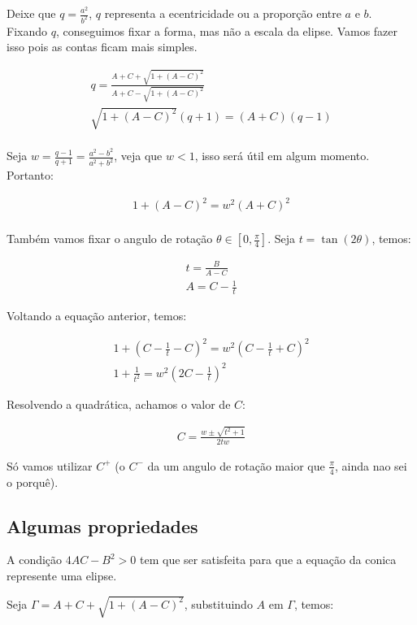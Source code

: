 \documentclass{article}
\begin{document}
	Deixe que $q = \frac{a^2}{b^2}$, $q$ representa a ecentricidade ou a proporção entre $a$ e $b$. Fixando $q$, conseguimos fixar a forma, mas não a escala da elipse. Vamos fazer isso pois as contas ficam mais simples.
	
	\begin{align*}
	q = \frac{A + C + \sqrt{1 + (A-C)^2}}{A + C - \sqrt{1 + (A-C)^2}}\\
	\sqrt{1 + (A-C)^2}(q+1) = (A+C)(q-1)\\
	\end{align*}
	
	Seja $w = \frac{q-1}{q+1} = \frac{a^2-b^2}{a^2+b^2}$, veja que $w < 1$, isso será útil em algum momento. Portanto:
	
	\begin{align*}
	1 + (A-C)^2 = w^2(A+C)^2\\	
	\end{align*}
	
	Também vamos fixar o angulo de rotação $\theta \in [0, \frac{\pi}{4}]$. Seja $t = \tan{(2\theta)}$, temos:
	
	\begin{align*}
	t = \frac{B}{A-C}\\
	A = C - \frac{1}{t}
	\end{align*}
	
	Voltando a equação anterior, temos:
	
	\begin{align*}
	1 + (C - \frac{1}{t} - C)^2 = w^2(C-\frac{1}{t} + C)^2\\
	1 + \frac{1}{t^2} = w^2(2C-\frac{1}{t})^2
	\end{align*}
	
	Resolvendo a quadrática, achamos o valor de $C$:
	
	\begin{align}
	C = \frac{w \pm \sqrt{t^2+1}}{2tw}
	\end{align}
	
	Só vamos utilizar $C^+$ (o $C^-$ da um angulo de rotação maior que $\frac{\pi}{4}$, ainda nao sei o porquê).
	
	\subsection{Algumas propriedades}
	
	A condição $4AC - B^2 > 0$ tem que ser satisfeita para que a equação da conica represente uma elipse.
	
	Seja $\Gamma = A+C+\sqrt{1+(A-C)^2}$, substituindo $A$ em $\Gamma$, temos:
	
\end{document}
